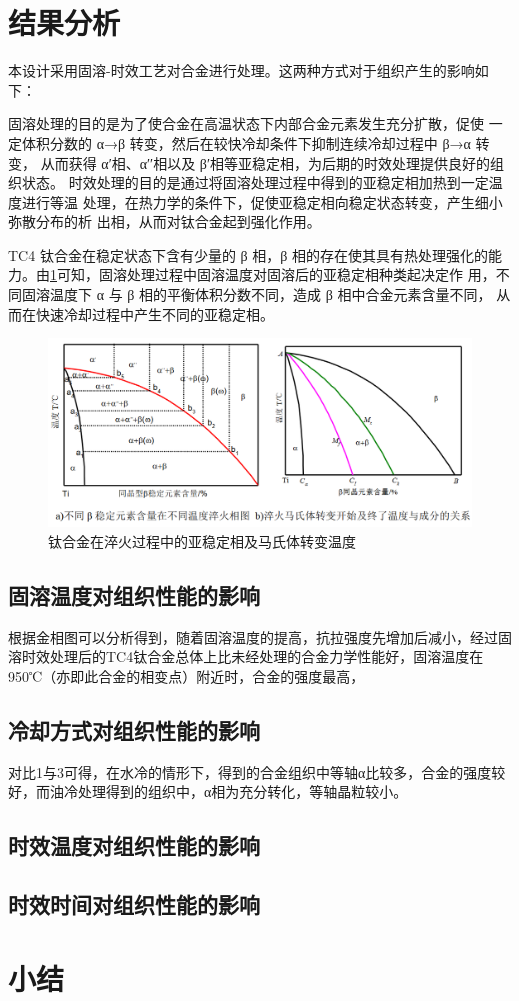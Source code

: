 \section{结果分析}
本设计采用固溶-时效工艺对合金进行处理。这两种方式对于组织产生的影响如下：

固溶处理的目的是为了使合金在高温状态下内部合金元素发生充分扩散，促使 一定体积分数的 α→β 转变，然后在较快冷却条件下抑制连续冷却过程中 β→α 转变， 从而获得 α′相、α′′相以及 β′相等亚稳定相，为后期的时效处理提供良好的组织状态。 时效处理的目的是通过将固溶处理过程中得到的亚稳定相加热到一定温度进行等温 处理，在热力学的条件下，促使亚稳定相向稳定状态转变，产生细小弥散分布的析 出相，从而对钛合金起到强化作用。

TC4 钛合金在稳定状态下含有少量的 β 相，β 相的存在使其具有热处理强化的能 力。由\ref{fig:tc4change}可知，固溶处理过程中固溶温度对固溶后的亚稳定相种类起决定作 用，不同固溶温度下 α 与 β 相的平衡体积分数不同，造成 β 相中合金元素含量不同， 从而在快速冷却过程中产生不同的亚稳定相。
\begin{figure}[h!]
	\centering
	\includegraphics[width=0.7\linewidth]{pic/tc4change}
	\caption{钛合金在淬火过程中的亚稳定相及马氏体转变温度}
	\label{fig:tc4change}
\end{figure}

\subsection{固溶温度对组织性能的影响}
根据金相图可以分析得到，随着固溶温度的提高，抗拉强度先增加后减小，经过固溶时效处理后的TC4钛合金总体上比未经处理的合金力学性能好，固溶温度在950℃（亦即此合金的相变点）附近时，合金的强度最高，
\subsection{冷却方式对组织性能的影响}
对比1与3可得，在水冷的情形下，得到的合金组织中等轴α比较多，合金的强度较好，而油冷处理得到的组织中，α相为充分转化，等轴晶粒较小。
\subsection{时效温度对组织性能的影响}

\subsection{时效时间对组织性能的影响}



\section{小结}